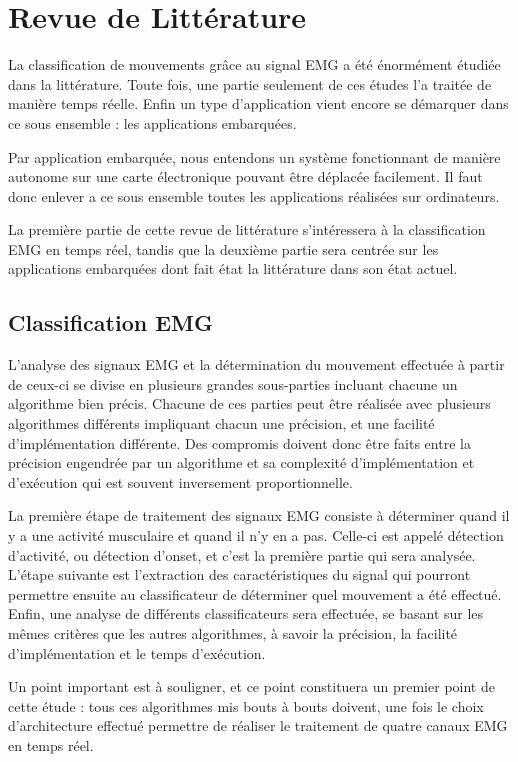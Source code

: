 \documentclass[letterpaper, twoside, 12pt, memoire, creativecommons, hyperref]{thETS}
\begin{document}
\chapter{Revue de Littérature}

La classification de mouvements grâce au signal EMG a été énormément étudiée dans la littérature. Toute fois, une partie seulement de ces études l'a traitée de manière temps réelle. Enfin un type d'application vient encore se démarquer dans ce sous ensemble : les applications embarquées. 

Par application embarquée, nous entendons un système fonctionnant de manière autonome sur une carte électronique pouvant être déplacée facilement. Il faut donc enlever a ce sous ensemble toutes les applications réalisées sur ordinateurs. 

La première partie de cette revue de littérature s’intéressera à la classification EMG en temps réel, tandis que la deuxième partie sera centrée sur les applications embarquées dont fait état la littérature dans son état actuel.

\section{Classification EMG}

L’analyse des signaux EMG et la détermination du mouvement effectuée à partir de ceux-ci se divise en plusieurs grandes sous-parties incluant chacune un algorithme bien précis. Chacune de ces parties peut être réalisée avec plusieurs algorithmes différents impliquant chacun une précision, et une facilité d’implémentation différente. Des compromis doivent donc être faits entre la précision engendrée par un algorithme et sa complexité d’implémentation et d’exécution qui est souvent inversement proportionnelle. 

La première étape de traitement des signaux EMG consiste à déterminer quand il y a une activité musculaire et quand il n’y en a pas. Celle-ci est appelé détection d’activité, ou détection d'onset, et c’est la première partie qui sera analysée. L’étape suivante est l’extraction des caractéristiques du signal qui pourront permettre ensuite au classificateur de déterminer quel mouvement a été effectué. Enfin, une analyse de différents classificateurs sera effectuée, se basant sur les mêmes critères que les autres algorithmes, à savoir la précision, la facilité d’implémentation et le temps d’exécution. 

Un point important est à souligner, et ce point constituera un premier point de cette étude : tous ces algorithmes mis bouts à bouts doivent, une fois le choix d’architecture effectué permettre de réaliser le traitement de quatre canaux EMG en temps réel.
\end{document}
